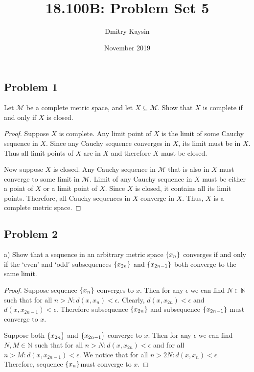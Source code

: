 \documentclass{article}
\title{18.100B: Problem Set 5}
\author{Dmitry Kaysin}
\date{November 2019}
\newcommand{\N}{\mathbb{N}}
\DeclarePairedDelimiter{\set}{ \{ }{ \} }
\begin{document}
\maketitle 


\subsection*{Problem 1}

\begin{tcolorbox}
Let $\mathcal{M}$ be a complete metric space, and let $X \subseteq \mathcal{M}$.
Show that $X$ is complete if and only if $X$ is closed.
\end{tcolorbox}

\begin{proof}

Suppose $X$ is complete.
Any limit point of $X$ is the limit of some Cauchy sequence in $X$.
Since any Cauchy sequence converges in $X$, its limit must be in $X$.
Thus all limit points of $X$ are in $X$ and therefore $X$ must be closed.

Now suppose $X$ is closed.
Any Cauchy sequence in $\mathcal{M}$ that is also in $X$ must converge to some limit in $\mathcal{M}$.
Limit of any Cauchy sequence in $X$ must be either a point of $X$ or a limit point of $X$. Since $X$ is closed, it contains all its limit points.
Therefore, all Cauchy sequences in $X$ converge in $X$.
Thus, $X$ is a complete metric space. 

\end{proof}


\subsection*{Problem 2}

\begin{tcolorbox}
a) Show that a sequence in an arbitrary metric space $\set{x_n}$ converges if and only if the ‘even’ and ‘odd’ subsequences $\set{x_{2n}}$ and $\set{x_{2n-1}}$ both converge to the same limit.
\end{tcolorbox}

\begin{proof}

Suppose sequence $\set{x_n}$ converges to $x$.
Then for any $\epsilon$ we can find $N \in \N$ such that for all $n > N: d(x, x_n) < \epsilon$.
Clearly, $d(x, x_{2n}) < \epsilon$ and $d(x, x_{2n-1}) < \epsilon$.
Therefore subsequence $\set{x_{2n}}$ and subsequence $\set{x_{2n-1}}$ must converge to $x$.

Suppose both $\set{x_{2n}}$ and $\set{x_{2n-1}}$ converge to $x$.
Then for any $\epsilon$ we can find $N, M \in \N$ such that for all $n > N: d(x, x_{2n}) < \epsilon$ and for all $n > M: d(x, x_{2n-1}) < \epsilon$.
We notice that for all $n > 2N: d(x, x_n) < \epsilon$.
Therefore, sequence $\set{x_n} $must converge to $x$.

\end{proof}
\end{document}
